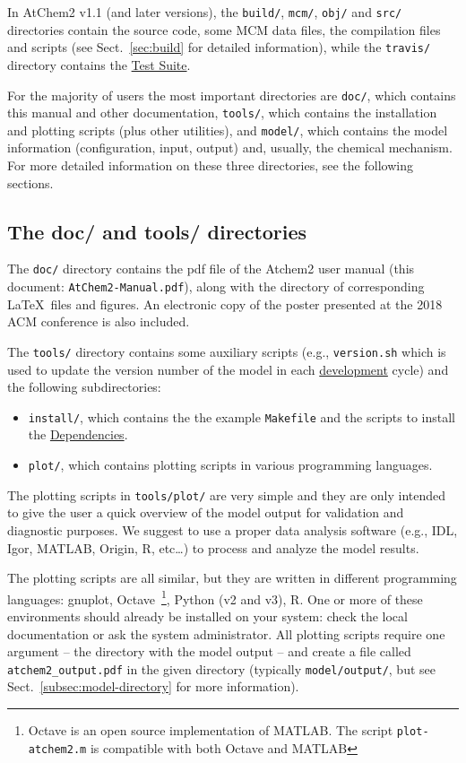 In AtChem2 v1.1 (and later versions), the \texttt{build/},
\texttt{mcm/}, \texttt{obj/} and \texttt{src/} directories contain the
source code, some MCM data files, the compilation files and scripts
(see Sect.~\ref{sec:build} for detailed information), while the
\texttt{travis/} directory contains the \hyperref[sec:test-suite]{Test Suite}.

For the majority of users the most important directories are
\texttt{doc/}, which contains this manual and other documentation,
\texttt{tools/}, which contains the installation and plotting scripts
(plus other utilities), and \texttt{model/}, which contains the model
information (configuration, input, output) and, usually, the chemical
mechanism. For more detailed information on these three directories,
see the following sections.

\subsection{The doc/ and tools/ directories} \label{subsec:doc-tools-directories}

The \texttt{doc/} directory contains the pdf file of the Atchem2 user
manual (this document: \texttt{AtChem2-Manual.pdf}), along with the
directory of corresponding \LaTeX\ files and figures. An electronic
copy of the poster presented at the 2018 ACM conference
\citep{sommariva_2018} is also included.

The \texttt{tools/} directory contains some auxiliary scripts (e.g.,
\texttt{version.sh} which is used to update the version number of the
model in each \hyperref[ch:development]{development} cycle) and the
following subdirectories:

\begin{itemize}
\item \texttt{install/}, which contains the the example
  \texttt{Makefile} and the scripts to install the
  \hyperref[sec:dependencies]{Dependencies}.
\item \texttt{plot/}, which contains plotting scripts in various
  programming languages.
\end{itemize}

The plotting scripts in \texttt{tools/plot/} are very simple and they
are only intended to give the user a quick overview of the model
output for validation and diagnostic purposes. We suggest to use a
proper data analysis software (e.g., IDL, Igor, MATLAB, Origin, R,
etc\ldots) to process and analyze the model results.

The plotting scripts are all similar, but they are written in
different programming languages: gnuplot, Octave~\footnote{Octave is
  an open source implementation of MATLAB. The script
  \texttt{plot-atchem2.m} is compatible with both Octave and MATLAB},
Python (v2 and v3), R. One or more of these environments should
already be installed on your system: check the local documentation or
ask the system administrator. All plotting scripts require one
argument -- the directory with the model output -- and create a file
called \texttt{atchem2\_output.pdf} in the given directory (typically
\texttt{model/output/}, but see Sect.~\ref{subsec:model-directory} for
more information).

